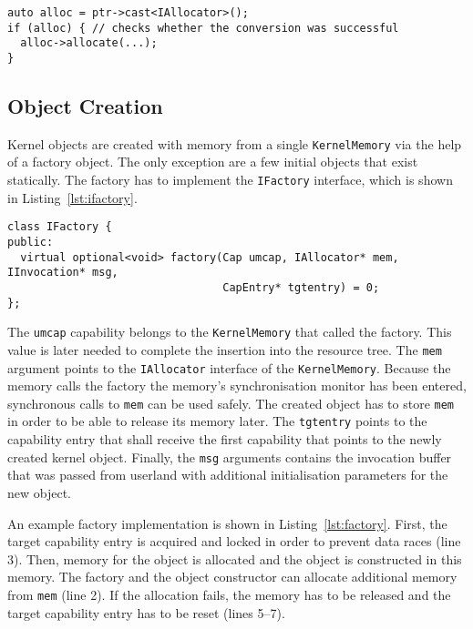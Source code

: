 \begin{lstlisting}[float, label=lst:cast, caption=Casting a kernel object into a more specific type.]
auto alloc = ptr->cast<IAllocator>();
if (alloc) { // checks whether the conversion was successful
  alloc->allocate(...);
}
\end{lstlisting}



\subsection{Object Creation}

Kernel objects are created with memory from a single
\texttt{KernelMemory} via the help of a factory object.  The only
exception are a few initial objects that exist statically.  The
factory has to implement the \texttt{IFactory} interface, which is
shown in Listing~\ref{lst:ifactory}.

\begin{lstlisting}[float, label=lst:ifactory, caption=The \texttt{IFactory} interface.]
class IFactory {
public:
  virtual optional<void> factory(Cap umcap, IAllocator* mem, IInvocation* msg,
                                 CapEntry* tgtentry) = 0;
};
\end{lstlisting}

The \texttt{umcap} capability belongs to the \texttt{KernelMemory}
that called the factory.  This value is later needed to complete the
insertion into the resource tree.  The \texttt{mem} argument points to
the \texttt{IAllocator} interface of the \texttt{KernelMemory}.
Because the memory calls the factory the memory's synchronisation
monitor has been entered, synchronous calls to \texttt{mem} can be
used safely.  The created object has to store \texttt{mem} in order to
be able to release its memory later.  The \texttt{tgtentry} points to
the capability entry that shall receive the first capability that
points to the newly created kernel object.  Finally, the \texttt{msg}
arguments contains the invocation buffer that was passed from userland
with additional initialisation parameters for the new object.

An example factory implementation is shown in
Listing~\ref{lst:factory}.  First, the target capability entry is
acquired and locked in order to prevent data races (line 3).  Then,
memory for the object is allocated and the object is constructed in
this memory.  The factory and the object constructor can allocate
additional memory from \texttt{mem} (line 2).  If the allocation
fails, the memory has to be released and the target capability entry
has to be reset (lines 5--7).

